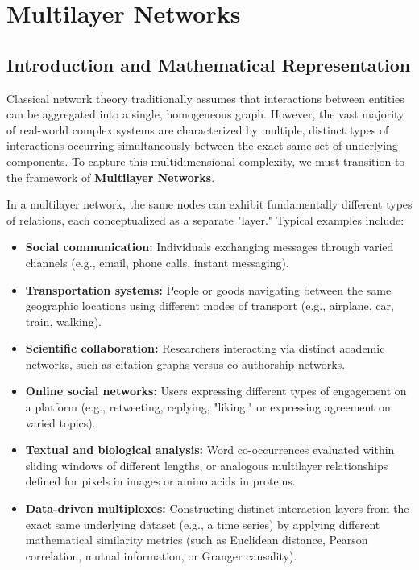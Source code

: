 \chapter{Multilayer Networks}
\label{chap:multilayer_networks}

\section{Introduction and Mathematical Representation}
\label{sec:intro_multilayer}

Classical network theory traditionally assumes that interactions between entities can be aggregated into a single, homogeneous graph. However, the vast majority of real-world complex systems are characterized by multiple, distinct types of interactions occurring simultaneously between the exact same set of underlying components. To capture this multidimensional complexity, we must transition to the framework of \textbf{Multilayer Networks}.

In a multilayer network, the same nodes can exhibit fundamentally different types of relations, each conceptualized as a separate "layer." Typical examples include:
\begin{itemize}
    \item \textbf{Social communication:} Individuals exchanging messages through varied channels (e.g., email, phone calls, instant messaging).
    \item \textbf{Transportation systems:} People or goods navigating between the same geographic locations using different modes of transport (e.g., airplane, car, train, walking).
    \item \textbf{Scientific collaboration:} Researchers interacting via distinct academic networks, such as citation graphs versus co-authorship networks.
    \item \textbf{Online social networks:} Users expressing different types of engagement on a platform (e.g., retweeting, replying, "liking," or expressing agreement on varied topics).
    \item \textbf{Textual and biological analysis:} Word co-occurrences evaluated within sliding windows of different lengths, or analogous multilayer relationships defined for pixels in images or amino acids in proteins.
    \item \textbf{Data-driven multiplexes:} Constructing distinct interaction layers from the exact same underlying dataset (e.g., a time series) by applying different mathematical similarity metrics (such as Euclidean distance, Pearson correlation, mutual information, or Granger causality).
\end{itemize}


